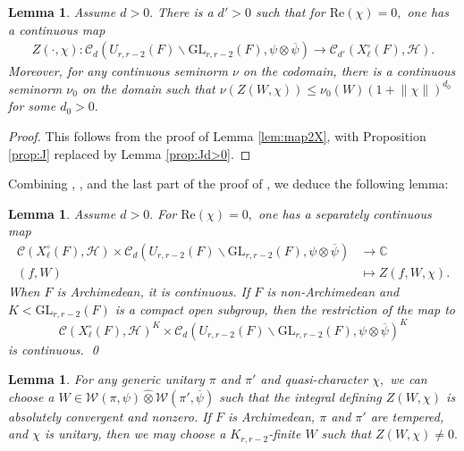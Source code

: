 \documentclass[12pt]{amsart}
\newtheorem{lem}[thm]{Lemma}
\theoremstyle{remark}
\numberwithin{equation}{section}
\newcommand{\GL}{\mathrm{GL}}
\newcommand{\lto}{\longrightarrow}
\newcommand{\CC}{\mathbb{C}}
\theoremstyle{definition}
\numberwithin{equation}{subsection}
\newcommand{\norm}[1]{\lVert#1\rVert}
\begin{document}
\begin{lem}
\label{lem:Z:cont0}
Assume $d>0.$  There is a $d'>0$ such that for $\mathrm{Re}(\chi)=0,$ one has a continuous map
\begin{align*}    Z(\cdot,\chi):\mathcal{C}_d(U_{r,r-2}(F) \backslash \GL_{r,r-2}(F),\psi \otimes \overline{\psi}) \lto \mathcal{C}_{d'}(X_\ell^\circ(F),\mathcal{H}).
\end{align*}
Moreover, for any continuous seminorm $\nu$ on the codomain, there is a continuous seminorm $\nu_0$ on the domain such that 
$
\nu(Z(W,\chi)) \leq \nu_0(W)(1+\norm{\chi})^{d_0}
$
for some $d_0>0.$
\end{lem}
\begin{proof} This follows from the
 proof of Lemma \ref{lem:map2X}, with Proposition \ref{prop:J} replaced by Lemma \ref{prop:Jd>0}.
 \end{proof}

Combining , , and the last part of the proof of , we deduce the following lemma:

\begin{lem} \label{lem:Z:cont} Assume $d>0.$ For $\mathrm{Re}(\chi) =0,$ one has a separately continuous map
\begin{align*}
\mathcal{C}(X_\ell^\circ(F),\mathcal{H}) \times \mathcal{C}_d(U_{r,r-2}(F) \backslash \GL_{r,r-2}(F),\psi \otimes \overline{\psi})  &\lto \CC\\
(f,W) &\longmapsto Z(f, W,\chi).
\end{align*} 
When $F$ is Archimedean, it is continuous.  If $F$ is non-Archimedean and $K <\GL_{r,r-2}(F)$ is a compact open subgroup, then the restriction of the map to 
$$
\mathcal{C}(X_\ell^\circ(F),\mathcal{H})^K \times \mathcal{C}_d(U_{r,r-2}(F) \backslash \GL_{r,r-2}(F),\psi \otimes \overline{\psi})^K
$$ is continuous.  
\qed
\end{lem}


\begin{lem} \label{lem:nonvanish}
For any generic unitary $\pi$ and $\pi'$ and quasi-character $\chi,$ we can choose a $W \in \mathcal{W}(\pi,\psi) \widehat{\otimes} \mathcal{W}(\pi',\overline{\psi})$ such that the integral defining $Z(W,\chi)$ is absolutely convergent and nonzero.  If $F$ is Archimedean, $\pi$ and $\pi'$ are tempered, and $\chi$ is unitary, then we may choose a $K_{r,r-2}$-finite $W$ such that $Z(W,\chi) \neq 0.$   
\end{lem}
\end{document}

